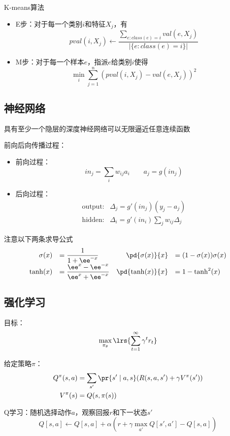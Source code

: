 K-means算法
\begin{itemize}
	\item E步：对于每一个类别$i$和特征$X_j$，有
	\[pval(i,X_j)\gets\frac{\sum_{e:class(e)=i}val(e,X_j)}{|\{e:class(e)=i\}|}\]
	\item M步：对于每一个样本$e$，指派$e$给类别$i$使得
	\[\min_i\sum_{j=1}^n(pval(i,X_j)-val(e,X_j))^2\]
\end{itemize}

\subsection{神经网络}
\begin{theorem}
具有至少一个隐层的深度神经网络可以无限逼近任意连续函数
\end{theorem}

前向后向传播过程：
\begin{itemize}
	\item 前向过程：
	\[in_j=\sum_i w_{ij}a_i\qquad a_j=g(in_j)\]
	\item 后向过程：
	\[\begin{aligned}
	\text{output:} & \Delta_j=g'(in_j)(y_j-a_j)\\
	\text{hidden:} & \Delta_i=g'(in_i)\sum_j w_{ij}\Delta_j
	\end{aligned}\]
\end{itemize}

注意以下两条求导公式
\[\begin{array}{rlrl}
\sigma(x)&=\dfrac{1}{1+\ee^{-x}} & \pd{\sigma(x)}{x}&=(1-\sigma(x))\sigma(x)\\
\tanh(x)&=\dfrac{\ee^x-\ee^{-x}}{\ee^x+\ee^{-x}} & \pd{\tanh(x)}{x}&=1-\tanh^2(x)
\end{array}\]

\subsection{强化学习}
目标：
\[\max_{\pi_\theta}\lrs{\sum_{t=1}^\infty\gamma^tr_t}\]

给定策略$\pi$：
\[\begin{aligned}
Q^\pi(s,a) &= \sum_{s'}\pr{s'\mid a,s}(R(s,a,s')+\gamma V^\pi(s'))\\
V^\pi(s) &= Q(s,\pi(s))
\end{aligned}\]

Q学习：随机选择动作$a$，观察回报$r$和下一状态$s'$
\[Q[s,a]\gets Q[s,a]+\alpha(r+\gamma\max_{a'}Q[s',a']-Q[s,a])\]